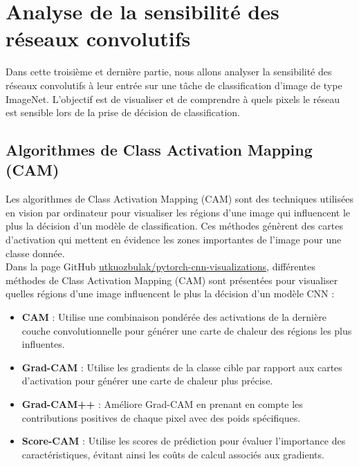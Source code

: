 \documentclass{article}
\begin{document}
\newpage

\section{Analyse de la sensibilité des réseaux convolutifs}

Dans cette troisième et dernière partie, nous allons analyser la sensibilité des réseaux convolutifs à leur entrée sur une tâche de classification d’image de type ImageNet. L’objectif est de visualiser et de comprendre à quels pixels le réseau est sensible lors de la prise de décision de classification.

\subsection{Algorithmes de Class Activation Mapping (CAM)}

Les algorithmes de Class Activation Mapping (CAM) sont des techniques utilisées en vision par ordinateur pour visualiser les régions d'une image qui influencent le plus la décision d'un modèle de classification. Ces méthodes génèrent des cartes d'activation qui mettent en évidence les zones importantes de l'image pour une classe donnée.\\

Dans la page GitHub \href{https://github.com/utkuozbulak/pytorch-cnn-visualizations}{utkuozbulak/pytorch-cnn-visualizations}, différentes méthodes de Class Activation Mapping (CAM) sont présentées pour visualiser quelles régions d'une image influencent le plus la décision d'un modèle CNN :

\begin{itemize}
    \item \textbf{CAM} : Utilise une combinaison pondérée des activations de la dernière couche convolutionnelle pour générer une carte de chaleur des régions les plus influentes.
    \item \textbf{Grad-CAM} : Utilise les gradients de la classe cible par rapport aux cartes d'activation pour générer une carte de chaleur plus précise.
    \item \textbf{Grad-CAM++} : Améliore Grad-CAM en prenant en compte les contributions positives de chaque pixel avec des poids spécifiques.
    \item \textbf{Score-CAM} : Utilise les scores de prédiction pour évaluer l'importance des caractéristiques, évitant ainsi les coûts de calcul associés aux gradients.
\end{itemize}
\end{document}

